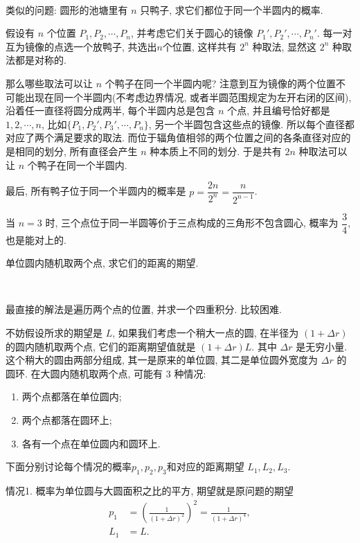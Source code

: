 ~

\noindent 类似的问题: 圆形的池塘里有 $n$ 只鸭子, 求它们都位于同一个半圆内的概率.

假设有 $n$ 个位置 $P_1, P_2, \cdots, P_n$, 并考虑它们关于圆心的镜像 $P_1', P_2', \cdots, P_n'$. 每一对互为镜像的点选一个放鸭子, 共选出$n$个位置, 这样共有 $2^n$ 种取法, 显然这 $2^n$ 种取法都是对称的. 

那么哪些取法可以让 $n$ 个鸭子在同一个半圆内呢? 注意到互为镜像的两个位置不可能出现在同一个半圆内(不考虑边界情况, 或者半圆范围规定为左开右闭的区间), 沿着任一直径将圆分成两半, 每个半圆内总是包含 $n$ 个点, 并且编号恰好都是 $1,2,\cdots,n$, 比如$\{P_1, P_2', P_3',\cdots,P_n\}$, 另一个半圆包含这些点的镜像. 所以每个直径都对应了两个满足要求的取法. 而位于辐角值相邻的两个位置之间的各条直径对应的是相同的划分, 所有直径会产生 $n$ 种本质上不同的划分. 于是共有 $2n$ 种取法可以让 $n$ 个鸭子在同一个半圆内.

最后, 所有鸭子位于同一个半圆内的概率是 $p=\dfrac{2n}{2^n} = \dfrac{n}{2^{n-1}}$.

当 $n=3$ 时, 三个点位于同一半圆等价于三点构成的三角形不包含圆心, 概率为 $\dfrac{3}{4}$, 也是能对上的.


\newpage

单位圆内随机取两个点, 求它们的距离的期望.

~

最直接的解法是遍历两个点的位置, 并求一个四重积分. 比较困难.

不妨假设所求的期望是 $L$, 如果我们考虑一个稍大一点的圆, 在半径为 $(1+\Delta r)$ 的圆内随机取两个点, 它们的距离期望值就是 $(1+\Delta r)L$. 其中 $\Delta r$ 是无穷小量. 这个稍大的圆由两部分组成, 其一是原来的单位圆, 其二是单位圆外宽度为 $\Delta r$ 的圆环. 
在大圆内随机取两个点, 可能有 $3$ 种情况: 
\begin{enumerate}
\item 两个点都落在单位圆内;
\item 两个点都落在圆环上;
\item 各有一个点在单位圆内和圆环上.
\end{enumerate}
下面分别讨论每个情况的概率$p_1, p_2, p_3$和对应的距离期望 $L_1, L_2, L_3$.

情况1. 概率为单位圆与大圆面积之比的平方, 期望就是原问题的期望
\begin{align*} 
p_1 &= \left( \frac{1}{(1+\Delta r)^2} \right)^2 = \frac{1}{(1+\Delta r)^4},\\
L_1 &= L.
\end{align*} 

